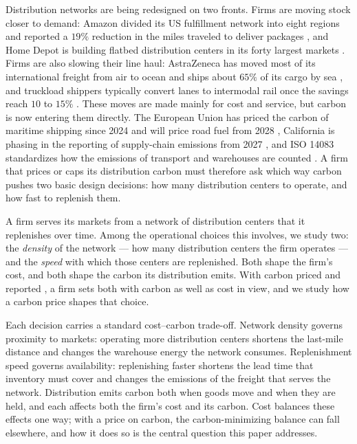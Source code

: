 \documentclass[11pt]{article}
\theoremstyle{definition}
\theoremstyle{remark}
\theoremstyle{plain}
\begin{document}
Distribution networks are being redesigned on two fronts. Firms are moving stock closer to demand: Amazon
divided its US fulfillment network into eight regions and reported a $19\%$ reduction in the miles traveled to
deliver packages \citep{amazon2023q2}, and Home Depot is building flatbed distribution centers in its forty
largest markets \citep{homedepot2020fdc}. Firms are also slowing their line haul: AstraZeneca has moved most of
its international freight from air to ocean and ships about $65\%$ of its cargo by sea
\citep{pharmcommerce2023astrazeneca}, and truckload shippers typically convert lanes to intermodal rail once the
savings reach $10$ to $15\%$ \citep{freightwaves2026intermodal}. These moves are made mainly for cost and
service, but carbon is now entering them directly. The European Union has priced the carbon of maritime shipping
since 2024 \citep{eu2023ets} and will price road fuel from 2028 \citep{eea2026ets2}, California is phasing in
the reporting of supply-chain emissions from 2027 \citep{california2023sb253}, and ISO 14083 standardizes how the
emissions of transport and warehouses are counted \citep{iso2023_14083}. A firm that prices or caps its
distribution carbon must therefore ask which way carbon pushes two basic design decisions: how many
distribution centers to operate, and how fast to replenish them.

A firm serves its markets from a network of distribution centers that it replenishes over time. Among the operational choices this involves, we study two: the \emph{density} of the network --- how many distribution centers the firm operates --- and the \emph{speed} with which those centers are replenished. Both shape the firm's cost, and both shape the carbon its distribution emits. With carbon priced and reported
\citep{mckinnon2012setting}, a firm sets both with carbon as well as cost in view, and we study how a carbon price
shapes that choice.

Each decision carries a standard cost--carbon trade-off. Network density governs proximity to markets: operating more distribution centers shortens the last-mile distance and changes the warehouse energy the network consumes. Replenishment speed governs availability: replenishing faster shortens the lead time that inventory must cover and changes the emissions of the freight that serves the network. Distribution emits carbon both when goods move and when they are held, and each affects both the firm's cost and its carbon. Cost balances these effects one way; with a price on carbon, the carbon-minimizing balance can fall elsewhere, and how it does so is the central question this paper addresses.
\end{document}
